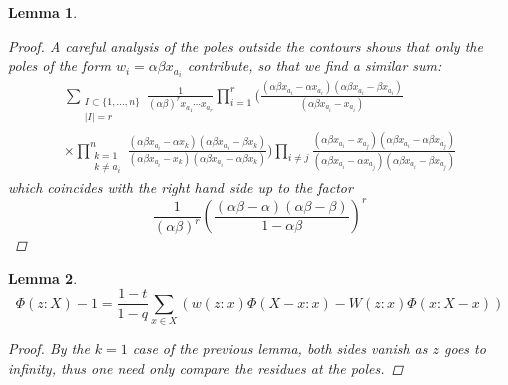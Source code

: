 \documentclass[12pt,dvips]{amsart}
\newtheorem{lemma}{Lemma}[section]
\begin{document}
\begin{lemma}
\begin{proof}
A careful analysis of the poles outside the contours shows that only the poles of the form $w_i=\alpha\beta x_{a_i}$
contribute, so that we find a similar sum:
\begin{multline*}
\sum_{\substack{I\subset\{1,\ldots,n\}\\|I|=r}}
\frac{1}{(\alpha\beta)^r x_{a_1}\cdots x_{a_r}}
\prod_{i=1}^r
\bigg( \frac{(\alpha\beta x_{a_i}-\alpha x_{a_i})(\alpha\beta x_{a_i}-\beta x_{a_i})}{(\alpha\beta x_{a_i}- x_{a_i})}
\\
\times\prod_{\substack{k=1\\k\ne a_i}}^n \frac{(\alpha\beta x_{a_i}-\alpha x_k)(\alpha\beta x_{a_i}-\beta x_k)}{(\alpha\beta x_{a_i}-x_k)(\alpha\beta x_{a_i}-\alpha\beta x_k)}
\bigg)
\prod_{i\ne j} \frac{(\alpha\beta x_{a_i}-x_{a_j})(\alpha\beta x_{a_i}-\alpha\beta x_{a_j})}{(\alpha\beta x_{a_i}-\alpha x_{a_j})(\alpha\beta x_{a_i}-\beta x_{a_j})}
\end{multline*}
which coincides with the right hand side up to the factor
\[
\frac{1}{(\alpha\beta)^r}
\left(\frac{(\alpha\beta-\alpha)(\alpha\beta-\beta)}{1-\alpha\beta}\right)^r
\]
\end{proof}
\end{lemma}

\begin{lemma}
$$ \Phi(z : X) - 1 = \frac{1-t}{1-q} \sum_{x \in X}\left( w(z : x) \Phi(X - x : x) - W(z: x) \Phi(x: X - x) \right)$$
\begin{proof}
By the $k=1$ case of the previous lemma, both sides vanish as $z$ goes to infinity, thus one need only compare the residues at the poles.
\end{proof}
\end{lemma}
\end{document}
